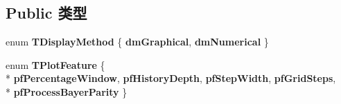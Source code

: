 \subsection*{Public 类型}
\begin{DoxyCompactItemize}
\item 
\hypertarget{class_plot_canvas_image_analysis_a808e23b20edfe21314eaf05c7b82feb4}{enum {\bfseries T\+Display\+Method} \{ {\bfseries dm\+Graphical}, 
{\bfseries dm\+Numerical}
 \}}\label{class_plot_canvas_image_analysis_a808e23b20edfe21314eaf05c7b82feb4}

\item 
\hypertarget{class_plot_canvas_image_analysis_a0e82e20537c699017c6a25f9a3363c67}{enum {\bfseries T\+Plot\+Feature} \{ \\*
{\bfseries pf\+Percentage\+Window}, 
{\bfseries pf\+History\+Depth}, 
{\bfseries pf\+Step\+Width}, 
{\bfseries pf\+Grid\+Steps}, 
\\*
{\bfseries pf\+Process\+Bayer\+Parity}
 \}}\label{class_plot_canvas_image_analysis_a0e82e20537c699017c6a25f9a3363c67}

\end{DoxyCompactItemize}

